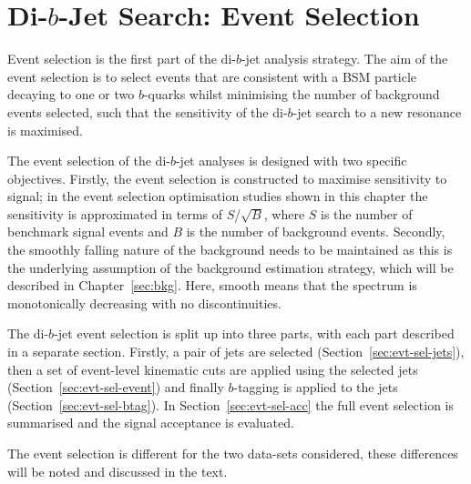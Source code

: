 \chapter{Di-$b$-Jet Search: Event Selection}
\label{sec:evt}

Event selection is the first part of the di-$b$-jet analysis strategy.
The aim of the event selection is to select events that are consistent with a BSM particle decaying to one or two $b$-quarks
whilst minimising the number of background events selected, such that the sensitivity of the di-$b$-jet search to a new resonance is maximised.

The event selection of the di-$b$-jet analyses is designed with two specific objectives.
Firstly, the event selection is constructed to maximise sensitivity to signal;
in the event selection optimisation studies shown in this chapter the sensitivity is approximated in terms of $S$/$\sqrt{B}$,
where $S$ is the number of benchmark signal events and $B$ is the number of background events.
Secondly, the smoothly falling nature of the background needs to be maintained
as this is the underlying assumption of the background estimation strategy,
which will be described in Chapter~\ref{sec:bkg}.
Here, smooth means that the spectrum is monotonically decreasing with no discontinuities.

The di-$b$-jet event selection is split up into three parts, with each part described in a separate section.
Firstly, a pair of jets are selected (Section~\ref{sec:evt-sel-jets}),
then a set of event-level kinematic cuts are applied using the selected jets (Section~\ref{sec:evt-sel-event})
and finally $b$-tagging is applied to the jets (Section~\ref{sec:evt-sel-btag}).
In Section~\ref{sec:evt-sel-acc} the full event selection is summarised and
the signal acceptance is evaluated.

The event selection is different for the two data-sets considered,
these differences will be noted and discussed in the text.

